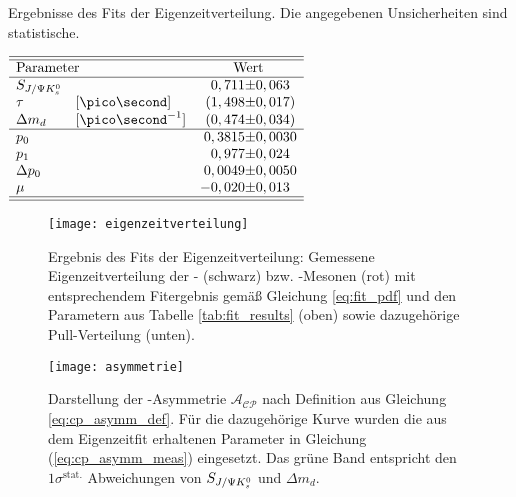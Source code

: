 \begin{table}[hptb]
\centering
\caption{Ergebnisse des Fits der Eigenzeitverteilung. Die angegebenen Unsicherheiten sind statistische.}
\label{tab:fit_results}
$\begin{array}{ll r@{\pm}l}
\hline 
\hline
\multicolumn{2}{l}{\text{Parameter}} & \multicolumn{2}{c}{\text{Wert}}\\
\hline
\SJPsi & & 0,711 & 0,063 \\
\tau & [\ps] & (1,498 & 0,017) \\
\Delta m_d & [\ps^{-1}] & (0,474 & 0,034) \\ \hline
p_0 & & 0,3815 & 0,0030\\
p_1 & & 0,977 & 0,024 \\
\Delta p_0 & & 0,0049 & 0,0050 \\
\mu & & -0,020 & 0,013 \\ \hline \hline
\end{array}$ 
\end{table}
\begin{figure}[hptb]
\centering
\texttt{[image: eigenzeitverteilung]}
\caption{Ergebnis des Fits der Eigenzeitverteilung: Gemessene Eigenzeitverteilung der \Bd- (schwarz) bzw. \Bdbar-Mesonen (rot) mit entsprechendem Fitergebnis gemäß Gleichung \ref{eq:fit_pdf} und den Parametern aus Tabelle \ref{tab:fit_results} (oben) sowie dazugehörige Pull-Verteilung (unten).}
\label{fig:fit_result}
\end{figure}
\begin{figure}[hptb]
\centering
\texttt{[image: asymmetrie]}
\caption{Darstellung der \CP-Asymmetrie $\mathcal{A_{CP}}$ nach Definition aus Gleichung \ref{eq:cp_asymm_def}. Für die dazugehörige Kurve wurden die aus dem Eigenzeitfit erhaltenen Parameter in Gleichung (\ref{eq:cp_asymm_meas}) eingesetzt. Das grüne Band entspricht den $1\sigma^{\text{stat.}}$ Abweichungen von $S_{J/\Psi K_s^0}$ und $\Delta m_d$.}
\label{fig:asymmetrie}
\end{figure}